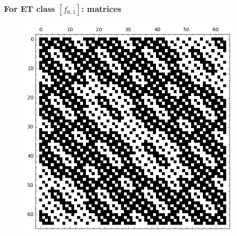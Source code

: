 \documentclass[pdf,sprung,slideColor,nocolorBG]{beamer}
\begin{document}
\begin{frame}
\frametitle{For ET class $[f_{6,1}]$: matrices}
\begin{figure}
\centering
\begin{minipage}{.48\textwidth}
  \centering
  \includegraphics[width=.9\linewidth]{../matrix_plot/c6_1_weight_class_matrix.png}
  \label{fig:6_1_weight_class_matrix}
\end{minipage}%
\begin{minipage}{.48\textwidth}
  \centering

\end{minipage}
\end{figure}
\end{frame}
\end{document}
